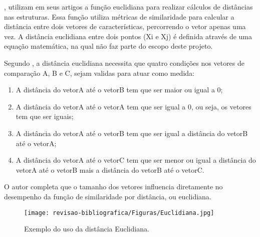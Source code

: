 ,  utilizam em seus artigos a função euclidiana para realizar cálculos de distâncias nas estruturas. Essa função utiliza métricas de similaridade para calcular a distância entre dois vetores de características, percorrendo o vetor apenas uma vez. A distância euclidiana entre dois pontos (Xi e Xj) é definida através de uma equação matemática, na qual não faz parte do escopo deste projeto.

%

Segundo , a distância euclidiana necessita que quatro condições nos vetores de comparação A, B e C, sejam validas para atuar como medida:

\begin{enumerate}
    \item A distância do vetorA até o vetorB tem que ser maior ou igual a 0;
    \item A distância do vetorA até o vetorA tem que ser igual a 0, ou seja, os vetores tem que ser iguais;
    \item A distância do vetorA até o vetorB tem que ser igual a distância do vetorB até o vetorA;
    \item A distância do vetorA até o vetorC tem que ser menor ou igual a distância do vetorA até o vetorB mais a distância do vetorB até o vetorC.
\end{enumerate}

O autor completa que o tamanho dos vetores influencia diretamente no desempenho da função de similaridade por distância, ou euclidiana.

\clearpage

\begin{figure}[!h]
\caption{{\footnotesize Exemplo do uso da distância Euclidiana.}}
 
\centering %
\texttt{[image: revisao-bibliografica/Figuras/Euclidiana.jpg]}%
\label{figura:figura8}

\centering {}
{
\label{figura:figura8}
}
\end{figure}
